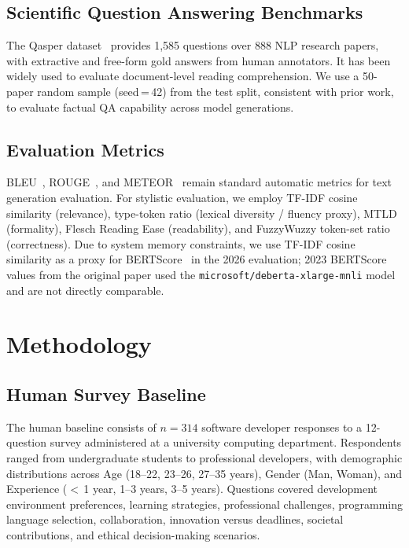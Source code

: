 \documentclass[11pt,a4paper]{article}
\begin{document}
\subsection{Scientific Question Answering Benchmarks}

The Qasper dataset~\citep{dasigi2021} provides 1,585 questions over 888 NLP
research papers, with extractive and free-form gold answers from human
annotators. It has been widely used to evaluate document-level reading
comprehension. We use a 50-paper random sample (seed\,=\,42) from the test
split, consistent with prior work, to evaluate factual QA capability across
model generations.

\subsection{Evaluation Metrics}

BLEU~\citep{papineni2002}, ROUGE~\citep{lin2004}, and METEOR~\citep{banerjee2005}
remain standard automatic metrics for text generation evaluation. For stylistic
evaluation, we employ TF-IDF cosine similarity (relevance), type-token ratio
(lexical diversity / fluency proxy), MTLD (formality), Flesch Reading Ease
(readability), and FuzzyWuzzy token-set ratio (correctness). Due to system
memory constraints, we use TF-IDF cosine similarity as a proxy for
BERTScore~\citep{zhang2019} in the 2026 evaluation; 2023 BERTScore values from
the original paper used the \texttt{microsoft/deberta-xlarge-mnli} model and
are not directly comparable.

\section{Methodology}
\label{sec:method}

\subsection{Human Survey Baseline}

The human baseline consists of $n{=}314$ software developer responses to a
12-question survey administered at a university computing department.
Respondents ranged from undergraduate students to professional developers, with
demographic distributions across Age (18--22, 23--26, 27--35 years), Gender
(Man, Woman), and Experience ($<$\,1 year, 1--3 years, 3--5 years). Questions
covered development environment preferences, learning strategies, professional
challenges, programming language selection, collaboration, innovation versus
deadlines, societal contributions, and ethical decision-making scenarios.
\end{document}
